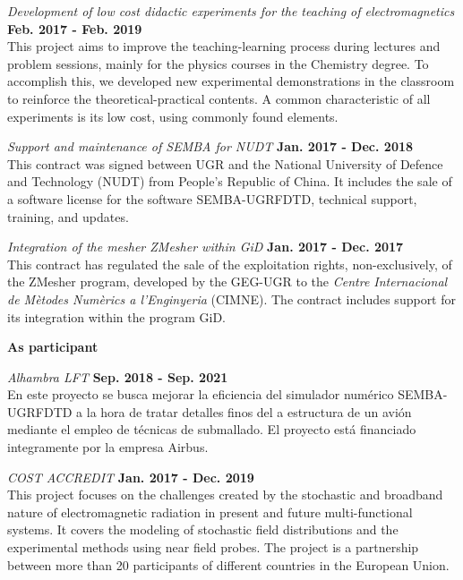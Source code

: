 \documentclass[margin,line]{res}
\begin{document}
\begin{resume}
\begin{minipage}{\textwidth}
	{\em Development of low cost didactic experiments for the teaching of electromagnetics} \hfill {\bf Feb. 2017 - Feb. 2019}\\
	This project aims to improve the teaching-learning process during lectures and problem sessions, mainly for the physics courses in the Chemistry degree. To accomplish this, we developed new experimental demonstrations in the classroom to reinforce the theoretical-practical contents. A common characteristic of all experiments is its low cost, using commonly found elements.
\end{minipage}

\begin{minipage}{\textwidth}
  {\em Support and maintenance of SEMBA for NUDT} \hfill {\bf Jan. 2017 - Dec. 2018}\\
  This contract was signed between UGR and the National University of Defence and Technology (NUDT) from People's Republic of China. It includes the sale of a software license for the software SEMBA-UGRFDTD, technical support, training, and updates. 
\end{minipage}

\begin{minipage}{\textwidth}
  {\em Integration of the mesher ZMesher within GiD} \hfill {\bf Jan. 2017 - Dec. 2017}\\[0.1cm]
  This contract has regulated the sale of the exploitation rights, non-exclusively, of the ZMesher program, developed by the GEG-UGR to the \textit{Centre Internacional de Mètodes Numèrics a l'Enginyeria} (CIMNE). The contract includes support for its integration within the program GiD. 
\end{minipage}

{\bf As participant}\\[0.15cm]
\begin{minipage}{\textwidth}
	{\em Alhambra LFT} \hfill {\bf Sep. 2018 - Sep. 2021}\\
	En este proyecto se busca mejorar la eficiencia del simulador numérico SEMBA-UGRFDTD a la hora de tratar detalles finos del a estructura de un avión mediante el empleo de técnicas de submallado. El proyecto está financiado integramente por la empresa Airbus.
\end{minipage}	

{\em COST ACCREDIT} \hfill {\bf Jan. 2017 - Dec. 2019}\\
This project focuses on the challenges created by the stochastic and broadband nature of electromagnetic radiation in present and future multi-functional systems. It covers the modeling of stochastic field distributions and the experimental methods using near field probes. The project is a partnership between more than 20 participants of different countries in the European Union.


\end{resume}
\end{document}
